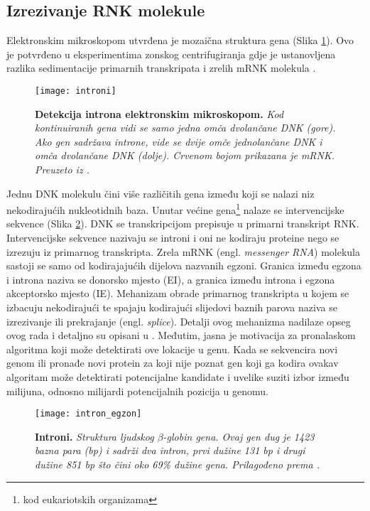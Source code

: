\subsection{Izrezivanje RNK molekule}
Elektronskim mikroskopom utvrđena je mozaična struktura gena (Slika \ref{fig:intron}). Ovo je potvrđeno u eksperimentima zonskog centrifugiranja gdje je ustanovljena razlika sedimentacije primarnih transkripata i zrelih mRNK molekula \cite{Berg01}.
\begin{center}
   \begin{figure}[ht!]
      \begin{center}
         \texttt{[image: introni]}
                 \caption[Detekcija introna elektronskim mikroskopom]{\textbf{Detekcija introna elektronskim mikroskopom.} \textit{Kod kontinuiranih gena vidi se samo jedna omča dvolančane DNK (gore). Ako gen sadržava introne, vide se dvije omče jednolančane DNK i omča dvolančane DNK (dolje). Crvenom bojom prikazana je mRNK. Preuzeto iz \cite{Berg01}.}}
         \label{fig:intron}
      \end{center}
   \end{figure}
\end{center}
Jednu DNK molekulu čini više različitih gena između koji se nalazi niz nekodirajućih nukleotidnih baza. Unutar većine gena\footnote{kod eukariotskih organizama} nalaze se intervencijske sekvence (Slika \ref{fig:gene}). DNK se transkripcijom prepisuje u primarni transkript RNK. Intervencijske sekvence nazivaju se introni i oni ne kodiraju proteine nego se izrezuju iz primarnog transkripta. Zrela mRNK (engl. \textit{messenger RNA}) molekula sastoji se samo od kodirajajućih dijelova nazvanih egzoni.
Granica između egzona i introna naziva se donorsko mjesto (EI), a granica između introna i egzona akceptorsko mjesto (IE). Mehanizam obrade primarnog transkripta u kojem se izbacuju nekodirajući te spajaju kodirajući slijedovi baznih parova naziva se izrezivanje ili prekrajanje (engl. \textit{splice}). Detalji ovog mehanizma nadilaze opseg ovog rada i detaljno su opisani u \cite{Brown01, Cox01}. Međutim, jasna je motivacija za pronalaskom algoritma koji može detektirati ove lokacije u genu. Kada se sekvencira novi genom ili pronađe novi protein za koji nije poznat gen koji ga kodira ovakav algoritam može detektirati potencijalne kandidate i uvelike suziti izbor između milijuna, odnosno milijardi potencijalnih pozicija u genomu.
\begin{center}
   \begin{figure}[t!]
      \begin{center}
         \texttt{[image: intron\_egzon]}
                 \caption[Introni]{\textbf{Introni.} \textit{Struktura ljudskog $\beta$-globin gena. Ovaj gen dug je 1423 bazna para (bp) i sadrži dva intron, prvi dužine 131 bp i drugi dužine 851 bp što čini oko 69\% dužine gena. Prilagođeno prema \cite{Brown01}.}}
         \label{fig:gene}
      \end{center}
   \end{figure}
\end{center}
